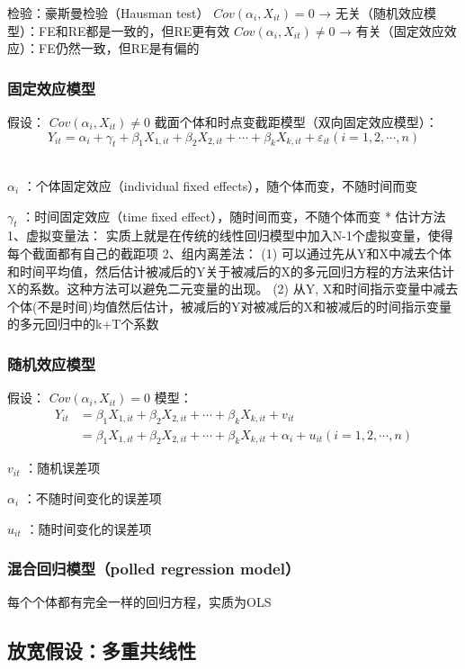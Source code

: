 \documentclass[12pt]{book}
\begin{document}
检验：豪斯曼检验（Hausman test）
$Cov(\alpha_i,X_{it})=0$ → 无关（随机效应模型）：FE和RE都是一致的，但RE更有效
$Cov(\alpha_i,X_{it})\neq 0 $ → 有关（固定效应效应）：FE仍然一致，但RE是有偏的

\subsubsection{固定效应模型}
假设： $Cov(\alpha_i,X_{it})\neq0$
截面个体和时点变截距模型（双向固定效应模型）：
$$Y_{it} =\alpha_i+\gamma_t+\beta_1X_{1,it}+\beta_2X_{2,it}+\cdots+\beta_kX_{k,it}+\varepsilon_{it}\left(i=1,2,\cdots,n\right) $$ \\  
\par $\alpha_i$ ：个体固定效应（individual fixed effects），随个体而变，不随时间而变
\par $\gamma_t$ ：时间固定效应（time fixed effect），随时间而变，不随个体而变
* 估计方法
1、虚拟变量法：
实质上就是在传统的线性回归模型中加入N-1个虚拟变量，使得每个截面都有自己的截距项
2、组内离差法：
(1) 可以通过先从Y和X中减去个体和时间平均值，然后估计被减后的Y关于被减后的X的多元回归方程的方法来估计X的系数。这种方法可以避免二元变量的出现。
(2) 从Y, X和时间指示变量中减去个体(不是时间)均值然后估计，被减后的Y对被减后的X和被减后的时间指示变量的多元回归中的k+T个系数

\subsubsection{随机效应模型}
假设： $Cov(\alpha_i,X_{it})=0 $
模型：
\begin{align*} 
    Y_{it} & = \beta_1 X_{1,it}+\beta_2 X_{2,it}+\cdots +\beta_k X_{k,it}+v_{it} \\ & =\beta_1 X_{1,it}+\beta_2 X_{2,it}+\cdots +\beta_k X_{k,it}+\alpha_i+u_{it} (i=1,2,⋯,n) 
\end{align*} 
\par $v_{it}$ ：随机误差项
\par $\alpha_i$ ：不随时间变化的误差项
\par $u_{it}$ ：随时间变化的误差项


\subsubsection{混合回归模型（polled regression model）}
每个个体都有完全一样的回归方程，实质为OLS




\subsection{放宽假设：多重共线性}
\end{document}

